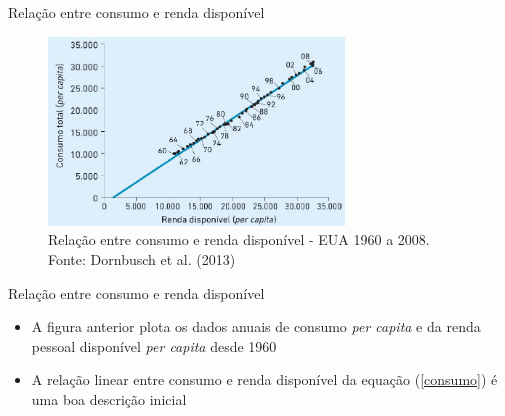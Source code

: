 \documentclass[10pt]{beamer}
\begin{document}
\begin{frame}{Relação entre consumo e renda disponível}
    \begin{figure}
        \centering
        \includegraphics[width=0.7\textwidth]{./figures/aula5_fig6.PNG}
        \caption{Relação entre consumo e renda disponível - EUA 1960 a 2008. Fonte: Dornbusch et al. (2013)}
        \label{aula5_fig6}
    \end{figure}
\end{frame}

\begin{frame}{Relação entre consumo e renda disponível}
\begin{itemize}
    \item A figura anterior plota os dados anuais de consumo \emph{per capita} e da renda pessoal disponível \emph{per capita} desde 1960\bigskip

    \item A  relação linear entre consumo e renda disponível da equação (\ref{consumo}) é uma boa descrição inicial    
    
\end{itemize}
\end{frame}
\end{document}
